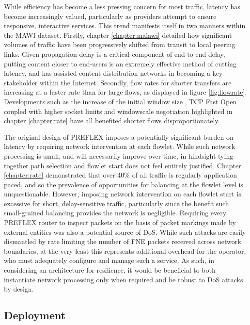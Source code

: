 While efficiency has become a less pressing concern for most traffic, latency has become increasingly valued, particularly as providers attempt to ensure responsive, interactive services.
This trend manifests itself in two manners within the \ac{MAWI} dataset.
Firstly, chapter \ref{chapter:malawi} detailed how significant volumes of traffic have been progressively shifted from transit to local peering links.
Given propagation delay is a critical component of end-to-end delay, putting content closer to end-users is an extremely effective method of cutting latency, and has assisted content distribution networks in becoming a key stakeholder within the Internet.
Secondly, flow rates for shorter transfers are increasing at a faster rate than for large flows, as displayed in figure \ref{fig:flowrate}.
Developments such as the increase of the initial window size \cite{Dukkipati:2010p160}, \ac{TCP} Fast Open \cite{Radhakrishnan:2011:TFO:2079296.2079317} coupled with higher socket limits and windowscale negotiation highlighted in chapter \ref{chapter:rate} have all benefited shorter flows disproportionately.

The original design of \ac{PREFLEX} imposes a potentially significant burden on latency by requiring network intervention at each flowlet.
While such network processing is small, and will necessarily improve over time, in hindsight tying together path selection and flowlet start does not feel entirely justified.
Chapter \ref{chapter:rate} demonstrated that over 40\% of all traffic is regularly application paced, and so the prevalence of opportunities for balancing at the flowlet level is unquestionable.
However, imposing network intervention on each flowlet start is excessive for short, delay-sensitive traffic, particularly since the benefit such small-grained balancing provides the network is negligible.
Requiring every \ac{PREFLEX} router to inspect packets on the basis of packet markings made by external entities was also a potential source of \acf{DoS}.
While such attacks are easily dismantled by rate limiting the number of \ac{FNE} packets received across network boundaries, at the very least this represents additional overhead for the operator, who must adequately configure and manage such a service.
As such, in considering an architecture for resilience, it would be beneficial to both instantiate network processing only when required and be robust to \ac{DoS} attacks by design.

\subsection{Deployment}

